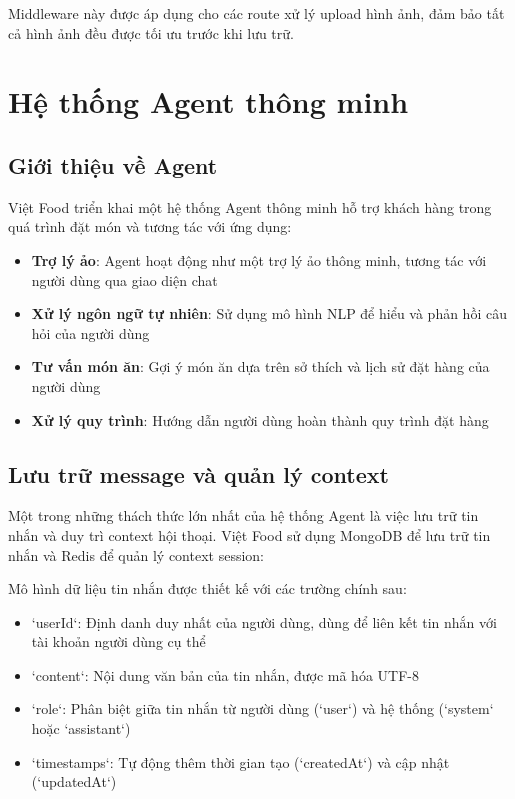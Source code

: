 Middleware này được áp dụng cho các route xử lý upload hình ảnh, đảm bảo tất cả hình ảnh đều được tối ưu trước khi lưu trữ.

\section{Hệ thống Agent thông minh}

\subsection{Giới thiệu về Agent}

Việt Food triển khai một hệ thống Agent thông minh hỗ trợ khách hàng trong quá trình đặt món và tương tác với ứng dụng:

\begin{itemize}
    \item \textbf{Trợ lý ảo}: Agent hoạt động như một trợ lý ảo thông minh, tương tác với người dùng qua giao diện chat
    \item \textbf{Xử lý ngôn ngữ tự nhiên}: Sử dụng mô hình NLP để hiểu và phản hồi câu hỏi của người dùng
    \item \textbf{Tư vấn món ăn}: Gợi ý món ăn dựa trên sở thích và lịch sử đặt hàng của người dùng
    \item \textbf{Xử lý quy trình}: Hướng dẫn người dùng hoàn thành quy trình đặt hàng
\end{itemize}


\subsection{Lưu trữ message và quản lý context}

Một trong những thách thức lớn nhất của hệ thống Agent là việc lưu trữ tin nhắn và duy trì context hội thoại. Việt Food sử dụng MongoDB để lưu trữ tin nhắn và Redis để quản lý context session:

Mô hình dữ liệu tin nhắn được thiết kế với các trường chính sau:

\begin{itemize}
    \item `userId`: Định danh duy nhất của người dùng, dùng để liên kết tin nhắn với tài khoản người dùng cụ thể
    \item `content`: Nội dung văn bản của tin nhắn, được mã hóa UTF-8
    \item `role`: Phân biệt giữa tin nhắn từ người dùng (`user`) và hệ thống (`system` hoặc `assistant`)
    \item `timestamps`: Tự động thêm thời gian tạo (`createdAt`) và cập nhật (`updatedAt`)
\end{itemize}

